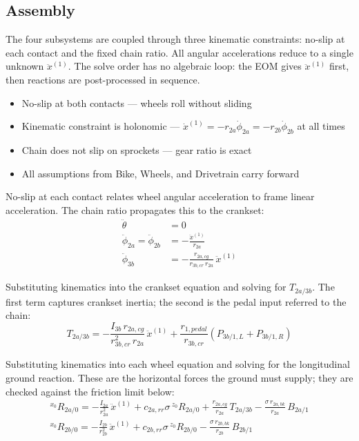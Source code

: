 \begin{aiblock}
\subsection{Assembly}
The four subsystems are coupled through three kinematic constraints: no-slip at each contact and the fixed chain ratio. All angular accelerations reduce to a single unknown $\ddot{x}^{(1)}$. The solve order has no algebraic loop: the EOM gives $\ddot{x}^{(1)}$ first, then reactions are post-processed in sequence.

\begin{itemize}
    \item No-slip at both contacts --- wheels roll without sliding
    \item Kinematic constraint is holonomic --- $\dot{x}^{(1)} = -r_{2a}\dot{\phi}_{2a} = -r_{2b}\dot{\phi}_{2b}$ at all times
    \item Chain does not slip on sprockets --- gear ratio is exact
    \item All assumptions from Bike, Wheels, and Drivetrain carry forward
\end{itemize}

No-slip at each contact relates wheel angular acceleration to frame linear acceleration. The chain ratio propagates this to the crankset:
\begin{align}
    \ddot{\theta} &= 0 \\
    \ddot{\phi}_{2a} = \ddot{\phi}_{2b} &= -\frac{\ddot{x}^{(1)}}{r_{2a}} \\
    \ddot{\phi}_{3b} &= -\frac{r_{2a,cg}}{r_{3b,cr}\,r_{2a}}\,\ddot{x}^{(1)}
\end{align}

Substituting kinematics into the crankset equation and solving for $T_{2a/3b}$. The first term captures crankset inertia; the second is the pedal input referred to the chain:
\begin{equation}
    \boxed{T_{2a/3b} = -\frac{I_{3b}\,r_{2a,cg}}{r_{3b,cr}^2\,r_{2a}}\,\ddot{x}^{(1)}
           + \frac{r_{1,pedal}}{r_{3b,cr}}\left(P_{3b/1,L} + P_{3b/1,R}\right)}
\end{equation}

Substituting kinematics into each wheel equation and solving for the longitudinal ground reaction. These are the horizontal forces the ground must supply; they are checked against the friction limit below:
\begin{align}
    \boxed{{}^{x_0}R_{2a/0} = -\frac{I_{2a}}{r_{2a}^2}\,\ddot{x}^{(1)}
        + c_{2a,rr}\sigma\,{}^{z_0}R_{2a/0}
        + \frac{r_{2a,cg}}{r_{2a}}\,T_{2a/3b}
        - \frac{\sigma\,r_{2a,bk}}{r_{2a}}\,B_{2a/1}} \\
    \boxed{{}^{x_0}R_{2b/0} = -\frac{I_{2b}}{r_{2b}^2}\,\ddot{x}^{(1)}
        + c_{2b,rr}\sigma\,{}^{z_0}R_{2b/0}
        - \frac{\sigma\,r_{2b,bk}}{r_{2b}}\,B_{2b/1}}
\end{align}


\end{aiblock}
